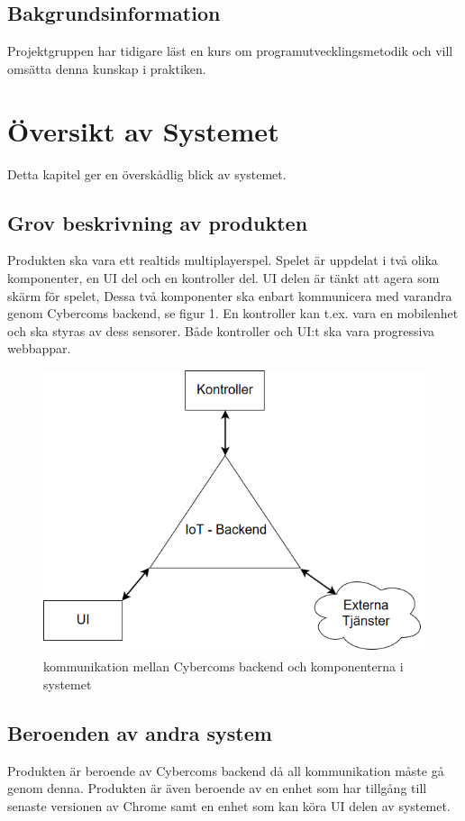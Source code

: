 \documentclass[10pt]{article}
\begin{document}
	\subsection{Bakgrundsinformation}
		Projektgruppen har tidigare läst en kurs om programutvecklingsmetodik och vill omsätta denna kunskap i praktiken. 
		
\pagebreak
\section{Översikt av Systemet}
	Detta kapitel ger en överskådlig blick av systemet.

	\subsection{Grov beskrivning av produkten}
	Produkten ska vara ett realtids multiplayerspel. Spelet är uppdelat i två olika komponenter, en UI del och en kontroller del. UI delen är tänkt att agera som skärm för spelet,  Dessa två komponenter ska enbart kommunicera med varandra genom Cybercoms backend, se figur 1. En kontroller kan t.ex. vara en mobilenhet och ska styras av dess sensorer. Både kontroller och UI:t ska vara progressiva webbappar. 
	
	\begin{figure}[h]
		\centering
		\includegraphics[scale=0.4]{backend}
		\caption{kommunikation mellan Cybercoms backend och komponenterna i systemet}
		\label{fig:backend}
	\end{figure}
	
	
	\subsection{Beroenden av andra system}
	Produkten är beroende av Cybercoms backend då all kommunikation måste gå genom denna. Produkten är även beroende av en enhet som har tillgång till senaste versionen av Chrome samt en enhet som kan köra UI delen av systemet.
\end{document}
